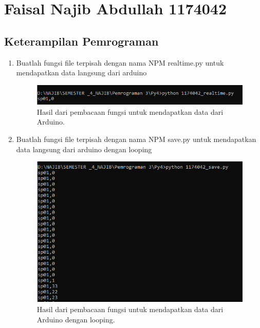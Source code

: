 \section{Faisal Najib Abdullah 1174042}
\subsection{Keterampilan Pemrograman}
\begin{enumerate}
	\item Buatlah fungsi file terpisah dengan nama NPM realtime.py untuk mendapatkan data langsung dari arduino
	

	\begin{figure}[H]
		\includegraphics[width=12cm]{figures/5/1174042/Praktek/1.png}
		\centering
		\caption{Hasil dari pembacaan fungsi untuk mendapatkan data dari Arduino.}
	\end{figure}
	
	\item Buatlah fungsi file terpisah dengan nama NPM save.py untuk mendapatkan data langsung dari arduino dengan looping
	

	\begin{figure}[H]
		\includegraphics[width=12cm]{figures/5/1174042/Praktek/2.png}
		\centering
		\caption{Hasil dari pembacaan fungsi untuk mendapatkan data dari Arduino dengan looping.}
	\end{figure}
	

\end{enumerate}
